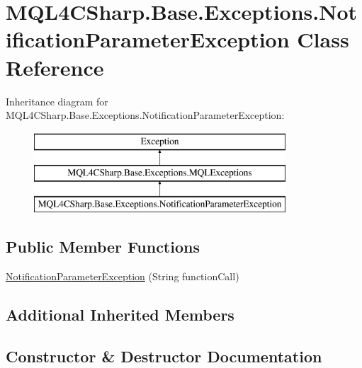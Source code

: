 \hypertarget{class_m_q_l4_c_sharp_1_1_base_1_1_exceptions_1_1_notification_parameter_exception}{}\section{M\+Q\+L4\+C\+Sharp.\+Base.\+Exceptions.\+Notification\+Parameter\+Exception Class Reference}
\label{class_m_q_l4_c_sharp_1_1_base_1_1_exceptions_1_1_notification_parameter_exception}
Inheritance diagram for M\+Q\+L4\+C\+Sharp.\+Base.\+Exceptions.\+Notification\+Parameter\+Exception\+:\begin{figure}[H]
\begin{center}
\leavevmode
\includegraphics[height=3.000000cm]{class_m_q_l4_c_sharp_1_1_base_1_1_exceptions_1_1_notification_parameter_exception}
\end{center}
\end{figure}
\subsection*{Public Member Functions}
\begin{DoxyCompactItemize}
\item 
\hyperlink{class_m_q_l4_c_sharp_1_1_base_1_1_exceptions_1_1_notification_parameter_exception_aed7714c5a635a8eede43d38c00acc5fe}{Notification\+Parameter\+Exception} (String function\+Call)
\end{DoxyCompactItemize}
\subsection*{Additional Inherited Members}


\subsection{Constructor \& Destructor Documentation}
